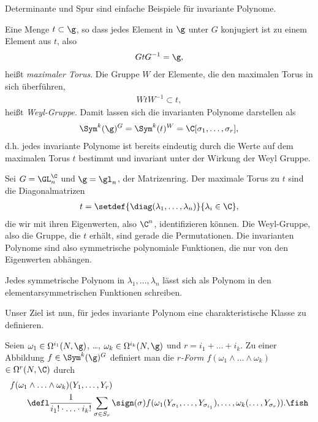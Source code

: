 \documentclass[%
	paper=a5,%
	fleqn,%
	DIV=18,%
	BCOR=0mm,
	fontsize=11pt,
	titlepage=false,%
	bibliography=totoc,
	DIV=18,%
	twoside=true,
	pdftitle=Riemannsche Geometrie,
	pdfauthor=Uwe Semmelmann,
	numbers=noendperiod]%
	{scrbook}
\begin{document}
Determinante und Spur sind einfache Beispiele für invariante Polynome.

\begin{rem}
Eine Menge $t\subset\g$, so dass jedes Element in $\g$ unter $G$ konjugiert ist zu einem Element aus $t$, also
\begin{align*}
GtG^{-1} = \g,
\end{align*}
heißt \emph{maximaler Torus}. Die Gruppe $W$ der Elemente, die den maximalen Torus in sich überführen,
\begin{align*}
WtW^{-1} \subset t,
\end{align*}
heißt \emph{Weyl-Gruppe}. Damit lassen sich die invarianten Polynome darstellen als
\begin{align*}
\Sym^k(\g)^G = \Sym^k(t)^W = \C[\sigma_{1},\ldots,\sigma_{r}],
\end{align*}
d.h. jedes invariante Polynome ist bereits eindeutig durch die Werte auf dem maximalen Torus $t$ bestimmt und invariant unter der Wirkung der Weyl Gruppe.\map
\end{rem}

\begin{ex}
Sei $G=\GL_n^\C$ und $\g = \gl_n$, der Matrizenring.  Der maximale Torus zu $t$ sind die Diagonalmatrizen
\begin{align*}
t = \setdef{\diag(\lambda_{1},\ldots,\lambda_{n})}{\lambda_{i}\in \C},
\end{align*}
die wir mit ihren Eigenwerten, also $\C^n$, identifizieren können. Die Weyl-Gruppe, also die Gruppe, die $t$ erhält, sind gerade die Permutationen. Die invarianten Polynome sind also symmetrische polynomiale Funktionen, die nur von den
Eigenwerten abhängen.~\boxc
\end{ex}

\begin{prop}
Jedes symmetrische Polynom in $\lambda_1,\ldots,\lambda_n$ lässt sich als
Polynom in den elementarsymmetrischen Funktionen schreiben.\fish
\end{prop}

Unser Ziel ist nun, für jedes invariante Polynom eine charakteristische Klasse
zu definieren.

\begin{defn}
Seien $\omega_1 \in \Omega^{i_1}(N,\g)$, \ldots, $\omega_k\in\Omega^{i_k}(N,\g)$
und $r=i_1+\ldots+i_k$. Zu einer Abbildung $f\in \Sym^k(\g)^G$ definiert man 
die \emph{$r$-Form $f(\omega_1\wedge \ldots \wedge
\omega_k)$} $\in\Omega^r(N,\C)$ durch
\begin{align*}
&f(\omega_1\wedge \ldots \wedge \omega_k)(Y_1,\ldots,Y_r) \\
&\qquad\defl
\frac{1}{i_1!\cdot \ldots \cdot i_k!} \sum_{\sigma\in S_r}
\sign(\sigma) f(\omega_1(Y_{\sigma_1},\ldots,Y_{\sigma_{i_1}}), \ldots,
\omega_k(\ldots,Y_{\sigma_r})).\fish
\end{align*}
\end{defn}
\end{document}
